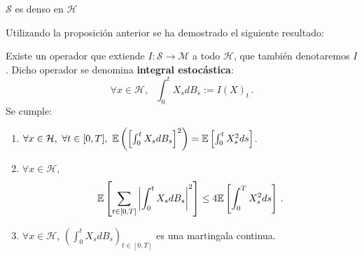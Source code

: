 \begin{proposition}
    $\mathcal{S}$ es denso en $\mathcal{H}$
\end{proposition}

Utilizando la proposición anterior se ha demostrado el siguiente resultado:
\begin{proposition}
    Existe un operador que extiende $I:\mathcal{S} \to \mathcal{M}$ a todo $\mathcal{H}$, que también denotaremos $I$. Dicho operador se denomina \textbf{integral estocástica}:
    \begin{equation*}
            \forall x \in \mathcal{H}, ~ ~ ~ \int_{0}^{t} X_s dB_s  := I(X)_t \,.
    \end{equation*}
Se cumple: 
\begin{enumerate}
    \item \label{IE:i} $\forall x \in \mathcal{H},~ \forall t \in [0,T], ~ \mathbb{E} \left( \left[ \int_{0}^{t} X_s dB_s \right]^2  \right) = \mathbb{E} \left[ \int_{0}^{t} X_s^2 ds  \right]$.
    \item $\label{IE:ii}\forall x \in \mathcal{H}$, 
        \begin{equation*}
            \mathbb{E} \left[ \sum_{t \in [0,T]} \abs{\int_{0}^{t} X_s dB_s}^2  \right] \le 4 \mathbb{E} \left[ \int_{0}^{T} X_s^2 ds \right]\,.
        \end{equation*}
    \item  \label{IE:iii} $\forall  x \in \mathcal{H}$, $\left(\int_{0}^{t} X_s dB_s \right)_{t \in [0,T]}$ es una martingala continua. 
\end{enumerate}
\end{proposition}
